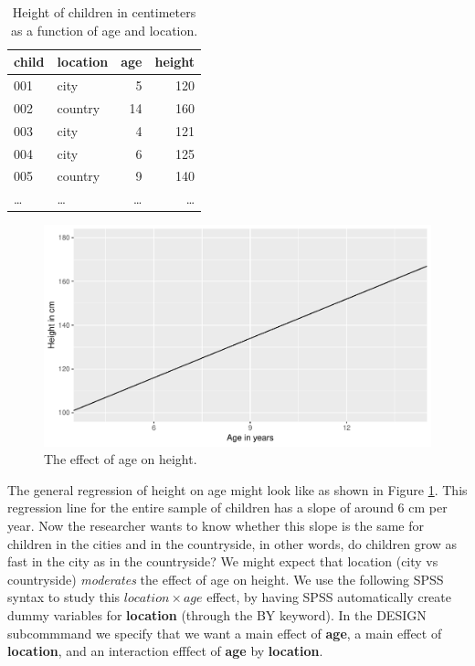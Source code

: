 \documentclass[]{report}\usepackage[]{graphicx}\usepackage[]{color}
\makeatletter
\def\maxwidth{ %
  \ifdim\Gin@nat@width>\linewidth
    \linewidth
  \else
    \Gin@nat@width
  \fi
}
\newenvironment{knitrout}{}{} %
\makeatother
\begin{document}
 \begin{table}
 \caption{Height of children in centimeters as a function of age and location.}
 \begin{tabular}{llrr}
 child & location & age & height\\ \hline
 001 & city & 5 & 120\\
 002 & country & 14 & 160\\
 003 & city & 4 & 121\\
 004 & city & 6 & 125\\
 005 & country & 9 & 140\\
 \dots & \dots & \dots & \dots\\
 \end{tabular}
 \label{tab:location}
 \end{table}



\begin{knitrout}
\color{fgcolor}\begin{figure}

{\centering \includegraphics[width=\maxwidth]{figure/summary_plot1-1} 

}

\caption[The effect of age on height]{The effect of age on height.}\label{fig:summary_plot1}
\end{figure}


\end{knitrout}

The general regression of height on age might look like as shown in Figure \ref{fig:summary_plot1}. This regression line for the entire sample of children has a slope of around 6 cm per year. Now the researcher wants to know whether this slope is the same for children in the cities and in the countryside, in other words, do children grow as fast in the city as in the countryside? We might expect that location (city vs countryside) \textit{moderates} the effect of age on height. We use the following SPSS syntax to study this $location \times age$ effect, by having SPSS automatically create dummy variables for \textbf{location} (through the BY keyword). In the DESIGN subcommmand we specify that we want a main effect of \textbf{age}, a main effect of \textbf{location}, and an interaction efffect of \textbf{age} by \textbf{location}. 
\end{document}
